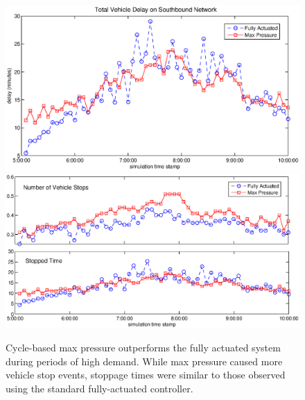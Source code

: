 \begin{figure}[h!]
\vspace{-1em}
\centering
\includegraphics[width=\columnwidth]{./VehicleDelayPlot.eps}\\
\includegraphics[width=\columnwidth]{./VehicleStopsPlot.eps}
\vspace{-2em}
\caption{Cycle-based max pressure outperforms the fully actuated system during periods of high demand. While max pressure caused more vehicle stop events, stoppage times were similar to those observed using the standard fully-actuated controller. \label{fig_delaystops}}
\vspace{-1em}
\end{figure}

